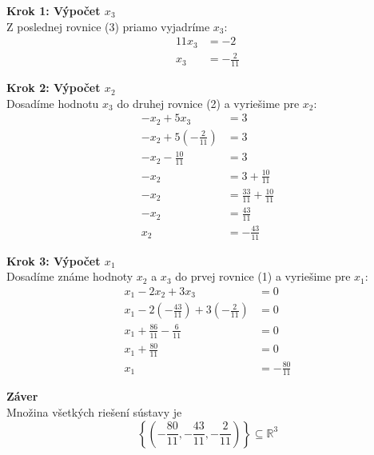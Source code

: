 \begin{example}
\noindent\textbf{Krok 1: Výpočet $x_3$} \\
Z poslednej rovnice (3) priamo vyjadríme $x_3$:
\begin{align*}
    11x_3 &= -2 \\
    x_3 &= -\frac{2}{11}
\end{align*}

\noindent\textbf{Krok 2: Výpočet $x_2$} \\
Dosadíme hodnotu $x_3$ do druhej rovnice (2) a vyriešime pre $x_2$:
\begin{align*}
    -x_2 + 5x_3 &= 3 \\
    -x_2 + 5\left(-\frac{2}{11}\right) &= 3 \\
    -x_2 - \frac{10}{11} &= 3 \\
    -x_2 &= 3 + \frac{10}{11} \\
    -x_2 &= \frac{33}{11} + \frac{10}{11} \\
    -x_2 &= \frac{43}{11} \\
    x_2 &= -\frac{43}{11}
\end{align*}

\noindent\textbf{Krok 3: Výpočet $x_1$} \\
Dosadíme známe hodnoty $x_2$ a $x_3$ do prvej rovnice (1) a vyriešime pre $x_1$:
\begin{align*}
    x_1 - 2x_2 + 3x_3 &= 0 \\
    x_1 - 2\left(-\frac{43}{11}\right) + 3\left(-\frac{2}{11}\right) &= 0 \\
    x_1 + \frac{86}{11} - \frac{6}{11} &= 0 \\
    x_1 + \frac{80}{11} &= 0 \\
    x_1&=-\frac{80}{11}
\end{align*}

\noindent\textbf{Záver} \\
Množina všetkých riešení sústavy je
\[
\left\{\left( -\frac{80}{11}, -\frac{43}{11}, -\frac{2}{11}
\right)\right\}\subseteq\mathbb R^3
\]
\end{example}

